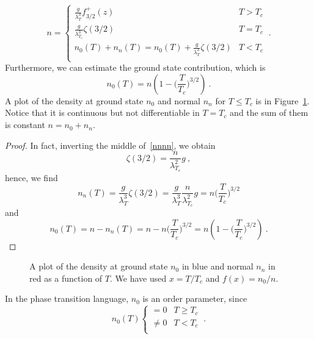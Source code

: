     \begin{equation}\label{nnnn}
        n = \begin{cases}
            \frac{g}{\lambda_T^3} f^+_{3/2} (z) & T > T_c \\
            \frac{g}{\lambda_{T_c}^3} \zeta(3/2) & T = T_c \\
            n_0(T) + n_n(T) = n_0 (T) + \frac{g}{\lambda_{T}^3} \zeta(3/2) & T < T_c \\
        \end{cases} ~.
    \end{equation}
    Furthermore, we can estimate the ground state contribution, which is 
    \begin{equation*}
        n_0 (T) = n (1 - \Big (\frac{T}{T_c} \Big)^{3/2}) ~.
    \end{equation*} 
    A plot of the density at ground state $n_0$ and normal $n_n$ for $T \leq T_c$ is in Figure~\ref{fig:nn}. Notice that it is continuous but not differentiable in $T = T_c$ and the sum of them is constant $n = n_0 + n_n$.
    \begin{proof}
        In fact, inverting the middle of~\eqref{nnnn}, we obtain 
        \begin{equation*}
            \zeta(3/2) = \frac{n}{\lambda_{T_c}^2}{g} ~,
        \end{equation*}
        hence, we find 
        \begin{equation*}
            n_n (T) = \frac{g}{\lambda_T^3} \zeta(3/2) = \frac{g}{\lambda_T^3} \frac{n}{\lambda_{T_c}^2}{g} = n \Big (\frac{T}{T_c} \Big)^{3/2} 
        \end{equation*}
        and 
        \begin{equation*}
            n_0 (T) = n - n_n(T) = n - n \Big (\frac{T}{T_c} \Big)^{3/2} = n (1 - \Big (\frac{T}{T_c} \Big)^{3/2}) ~.
        \end{equation*}
    \end{proof}
    \begin{figure}
        \centering
        \caption{A plot of the density at ground state $n_0$ in blue and normal $n_n$ in red as a function of $T$. We have used $x = T / T_c$ and $f(x) = n_0 / n$.}
        \label{fig:nn}
    \end{figure}
    In the phase transition language, $n_0$ is an order parameter, since 
    \begin{equation*}
        n_0 (T) \begin{cases}
            = 0 & T \geq T_c \\
            \neq 0 & T < T_c \\
        \end{cases} ~.
    \end{equation*}

